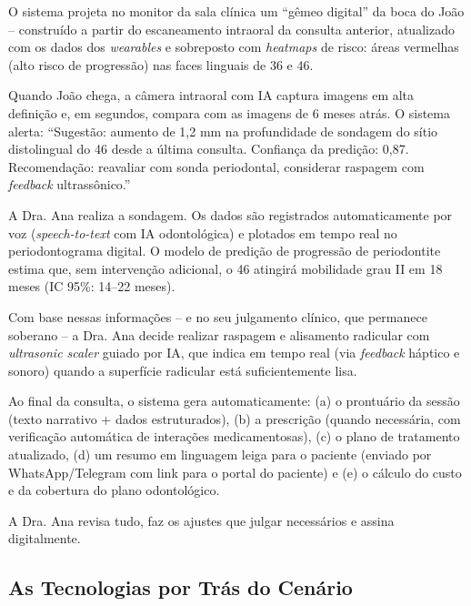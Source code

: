 O sistema projeta no monitor da sala clínica um ``gêmeo digital'' da boca do
João -- construído a partir do escaneamento intraoral da consulta anterior,
atualizado com os dados dos \textit{wearables} e sobreposto com \textit{
heatmaps} de risco: áreas vermelhas (alto risco de progressão) nas faces
linguais de 36 e 46.

Quando João chega, a câmera intraoral com IA captura imagens em alta definição
e, em segundos, compara com as imagens de 6 meses atrás. O sistema alerta:
``Sugestão: aumento de 1,2 mm na profundidade de sondagem do sítio distolingual
do 46 desde a última consulta. Confiança da predição: 0,87. Recomendação:
reavaliar com sonda periodontal, considerar raspagem com \textit{feedback}
ultrassônico.''

A Dra. Ana realiza a sondagem. Os dados são registrados automaticamente por voz
(\textit{speech-to-text} com IA odontológica) e plotados em tempo real no
periodontograma digital. O modelo de predição de progressão de periodontite
estima que, sem intervenção adicional, o 46 atingirá mobilidade grau II em 18
meses (IC 95\%: 14--22 meses).

Com base nessas informações -- e no seu julgamento clínico, que permanece
soberano -- a Dra. Ana decide realizar raspagem e alisamento radicular com
\textit{ultrasonic scaler} guiado por IA, que indica em tempo real (via
\textit{feedback} háptico e sonoro) quando a superfície radicular está
suficientemente lisa.

Ao final da consulta, o sistema gera automaticamente: (a) o prontuário da sessão
(texto narrativo + dados estruturados), (b) a prescrição (quando necessária,
com verificação automática de interações medicamentosas), (c) o plano de
tratamento atualizado, (d) um resumo em linguagem leiga para o paciente (enviado
por WhatsApp/Telegram com link para o portal do paciente) e (e) o cálculo do
custo e da cobertura do plano odontológico.

A Dra. Ana revisa tudo, faz os ajustes que julgar necessários e assina
digitalmente.

\subsection{As Tecnologias por Trás do Cenário}


